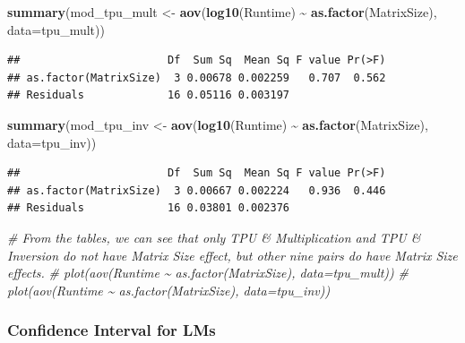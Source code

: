 \documentclass[
]{article}
\newenvironment{Shaded}{\begin{snugshade}}{\end{snugshade}}
\newcommand{\CommentTok}[1]{\textcolor[rgb]{0.56,0.35,0.01}{\textit{#1}}}
\newcommand{\DataTypeTok}[1]{\textcolor[rgb]{0.13,0.29,0.53}{#1}}
\newcommand{\KeywordTok}[1]{\textcolor[rgb]{0.13,0.29,0.53}{\textbf{#1}}}
\newcommand{\NormalTok}[1]{#1}
\newcommand{\OperatorTok}[1]{\textcolor[rgb]{0.81,0.36,0.00}{\textbf{#1}}}
\newcommand{\StringTok}[1]{\textcolor[rgb]{0.31,0.60,0.02}{#1}}
\begin{document}
\begin{Shaded}
\begin{Highlighting}[]
\KeywordTok{summary}\NormalTok{(mod\_tpu\_mult \textless{}{-}}\StringTok{ }\KeywordTok{aov}\NormalTok{(}\KeywordTok{log10}\NormalTok{(Runtime) }\OperatorTok{\textasciitilde{}}\StringTok{ }\KeywordTok{as.factor}\NormalTok{(MatrixSize), }\DataTypeTok{data=}\NormalTok{tpu\_mult))}
\end{Highlighting}
\end{Shaded}

\begin{verbatim}
##                       Df  Sum Sq  Mean Sq F value Pr(>F)
## as.factor(MatrixSize)  3 0.00678 0.002259   0.707  0.562
## Residuals             16 0.05116 0.003197
\end{verbatim}

\begin{Shaded}
\begin{Highlighting}[]
\KeywordTok{summary}\NormalTok{(mod\_tpu\_inv \textless{}{-}}\StringTok{ }\KeywordTok{aov}\NormalTok{(}\KeywordTok{log10}\NormalTok{(Runtime) }\OperatorTok{\textasciitilde{}}\StringTok{ }\KeywordTok{as.factor}\NormalTok{(MatrixSize), }\DataTypeTok{data=}\NormalTok{tpu\_inv))}
\end{Highlighting}
\end{Shaded}

\begin{verbatim}
##                       Df  Sum Sq  Mean Sq F value Pr(>F)
## as.factor(MatrixSize)  3 0.00667 0.002224   0.936  0.446
## Residuals             16 0.03801 0.002376
\end{verbatim}

\begin{Shaded}
\begin{Highlighting}[]
\CommentTok{\# From the tables, we can see that only TPU \& Multiplication and TPU \& Inversion do not have Matrix Size effect, but other nine pairs do have Matrix Size effects.}
\CommentTok{\# plot(aov(Runtime \textasciitilde{} as.factor(MatrixSize), data=tpu\_mult))}
\CommentTok{\# plot(aov(Runtime \textasciitilde{} as.factor(MatrixSize), data=tpu\_inv))}
\end{Highlighting}
\end{Shaded}

\hypertarget{confidence-interval-for-lms}{%
\subsubsection{Confidence Interval for
LMs}\label{confidence-interval-for-lms}}
\end{document}
